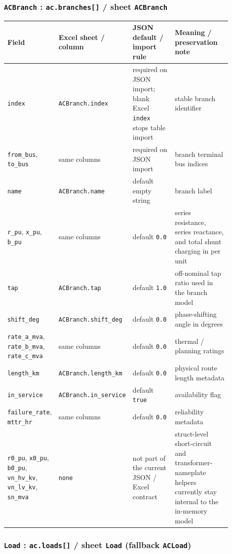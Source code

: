\subsubsection*{\texttt{ACBranch} : \texttt{ac.branches[]} / sheet \texttt{ACBranch}}

\begin{longtable}{L{0.20\linewidth}L{0.24\linewidth}L{0.20\linewidth}L{0.26\linewidth}}
\toprule
Field & Excel sheet / column & JSON default / import rule & Meaning / preservation note \\
\midrule
\endhead
\texttt{index} & \texttt{ACBranch.index} & required on JSON import; blank Excel \texttt{index} stops table import & stable branch identifier \\
\texttt{from\_bus}, \texttt{to\_bus} & same columns & required on JSON import & branch terminal bus indices \\
\texttt{name} & \texttt{ACBranch.name} & default empty string & branch label \\
\texttt{r\_pu}, \texttt{x\_pu}, \texttt{b\_pu} & same columns & default \texttt{0.0} & series resistance, series reactance, and total shunt charging in per unit \\
\texttt{tap} & \texttt{ACBranch.tap} & default \texttt{1.0} & off-nominal tap ratio used in the branch model \\
\texttt{shift\_deg} & \texttt{ACBranch.shift\_deg} & default \texttt{0.0} & phase-shifting angle in degrees \\
\texttt{rate\_a\_mva}, \texttt{rate\_b\_mva}, \texttt{rate\_c\_mva} & same columns & default \texttt{0.0} & thermal / planning ratings \\
\texttt{length\_km} & \texttt{ACBranch.length\_km} & default \texttt{0.0} & physical route length metadata \\
\texttt{in\_service} & \texttt{ACBranch.in\_service} & default \texttt{true} & availability flag \\
\texttt{failure\_rate}, \texttt{mttr\_hr} & same columns & default \texttt{0.0} & reliability metadata \\
\texttt{r0\_pu}, \texttt{x0\_pu}, \texttt{b0\_pu}, \texttt{vn\_hv\_kv}, \texttt{vn\_lv\_kv}, \texttt{sn\_mva} & \texttt{none} & not part of the current JSON / Excel contract & struct-level short-circuit and transformer-nameplate helpers currently stay internal to the in-memory model \\
\bottomrule
\end{longtable}

\subsubsection*{\texttt{Load} : \texttt{ac.loads[]} / sheet \texttt{Load} (fallback \texttt{ACLoad})}

